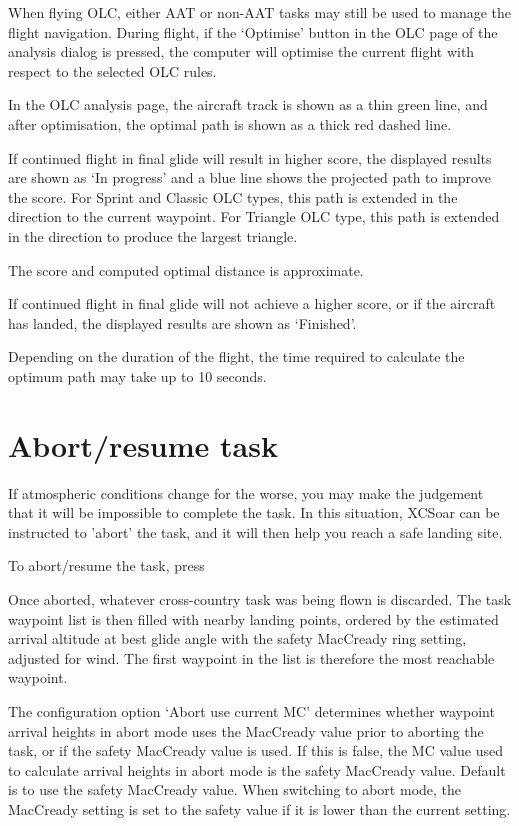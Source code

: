 \documentclass[a4paper,12pt]{refrep}
\begin{document}
  When flying OLC, either AAT or non-AAT tasks may still be used to
  manage the flight navigation.  During flight, if the `Optimise'
  button in the OLC page of the analysis dialog is pressed, the
  computer will optimise the current flight with respect to the
  selected OLC rules.  

  In the OLC analysis page, the aircraft track is shown as a thin
  green line, and after optimisation, the optimal path is shown as a
  thick red dashed line.

  If continued flight in final glide will result
  in higher score, the displayed results are shown as `In progress'
  and a blue line shows the projected path to improve the score.
  For Sprint and Classic OLC types, this path is extended in the direction
  to the current waypoint.  For Triangle OLC type, this path is extended
  in the direction to produce the largest triangle.

  The score and computed optimal distance is approximate.

  If continued flight in final glide will not achieve a higher score,
  or if the aircraft has landed, the displayed results are shown as
  `Finished'.  

  Depending on the duration of the flight, the time required to
  calculate the optimum path may take up to 10 seconds.

\section{Abort/resume task}

If atmospheric conditions change for the worse, you may make the
judgement that it will be impossible to complete the task.  In this
situation, XCSoar can be instructed to 'abort' the task, and it will
then help you reach a safe landing site.

To abort/resume the task, press
\begin{quote}
\blink{}\blink{}
\end{quote}

Once aborted, whatever cross-country task was being flown is
discarded.  The task waypoint list is then filled with nearby landing
points, ordered by the estimated arrival altitude at best glide angle
with the safety MacCready ring setting, adjusted for wind.  The
first waypoint in the list is therefore the most reachable waypoint.

The configuration option `Abort use current MC' determines whether
waypoint arrival heights in abort mode uses the MacCready value prior
to aborting the task, or if the safety MacCready value is used.  If
this is false, the MC value used to calculate arrival heights in abort
mode is the safety MacCready value.  Default is to use the safety
MacCready value.  When switching to abort mode, the MacCready setting
is set to the safety value if it is lower than the current setting.
\end{document}

